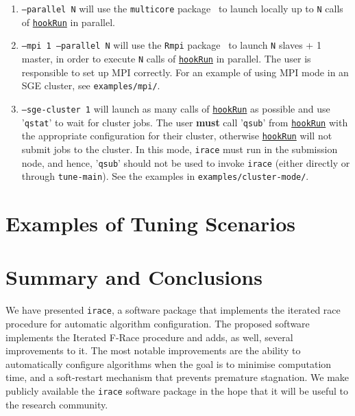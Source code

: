 \documentclass[a4paper]{article}
\newcommand{\irace}{\texttt{irace}\xspace}
\newcommand{\parameter}[1]{\hyperlink{opt:#1}{\texttt{#1}}}
\begin{document}
\begin{enumerate}
\item \texttt{--parallel N}\hspace{2ex} will use the \texttt{multicore} package~\citep{R:multicore} to launch locally
  up to \texttt{N} calls of \parameter{hookRun} in parallel.

  \item \texttt{--mpi 1 --parallel N}\hspace{2ex}  will use the \texttt{Rmpi} package~\cite{R:Rmpi} to launch \texttt{N}
  slaves + 1 master, in order to execute \texttt{N} calls of \parameter{hookRun} in
  parallel. The user is responsible to set up MPI correctly. For an
  example of using MPI mode in an SGE cluster, see \texttt{examples/mpi/}.

\item \texttt{--sge-cluster 1}\hspace{2ex}  will launch as many calls
  of \parameter{hookRun} as possible and use '\texttt{qstat}' to wait
  for cluster jobs. The user \textbf{must} call '\texttt{qsub}'
  from \parameter{hookRun} with the appropriate configuration for
  their cluster, otherwise \parameter{hookRun} will not submit jobs to
  the cluster. In this mode, \irace must run in the submission node,
  and hence, '\texttt{qsub}' should not be used to invoke \irace
  (either directly or through \texttt{tune-main}).  See the examples
  in \texttt{examples/cluster-mode/}.
\end{enumerate}


\section{Examples of Tuning Scenarios}\label{sec:applications}





%

\section{Summary and Conclusions}

We have presented \irace, a software package that implements the
iterated race procedure for automatic algorithm configuration. The
proposed software implements the Iterated F-Race procedure and adds,
as well, several improvements to it. The most notable improvements are
the ability to automatically configure algorithms when the goal is to
minimise computation time, and a soft-restart mechanism that prevents
premature stagnation. We make publicly available the \irace software
package in the hope that it will be useful to the research community.
\end{document}
